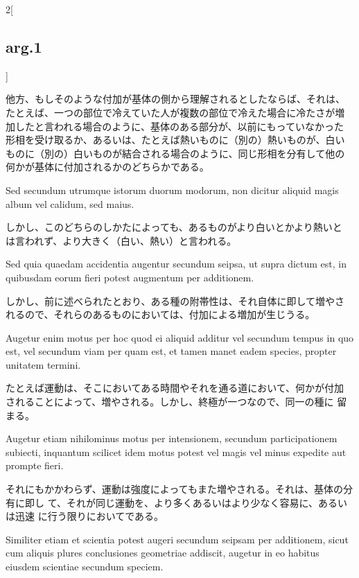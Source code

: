 \documentclass[paper=a4paper,fontsize=10pt,jafontsize=9pt,titlepage]{jlreq}
\begin{document}
\begin{paracol}{2}[\subsection{arg.1}]
\switchcolumn

他方、もしそのような付加が基体の側から理解されるとしたならば、それは、
たとえば、一つの部位で冷えていた人が複数の部位で冷えた場合に冷たさが増
加したと言われる場合のように、基体のある部分が、以前にもっていなかった
形相を受け取るか、あるいは、たとえば熱いものに（別の）熱いものが、白い
ものに（別の）白いものが結合される場合のように、同じ形相を分有して他の
何かが基体に付加されるかのどちらかである。

\switchcolumn*

Sed secundum utrumque istorum
duorum modorum, non dicitur aliquid magis album vel calidum, sed
maius.

\switchcolumn

しかし、このどちらのしかたによっても、あるものがより白いとかより熱いと
は言われず、より大きく（白い、熱い）と言われる。

\switchcolumn*

Sed quia quaedam accidentia augentur secundum seipsa, ut supra
dictum est, in quibusdam eorum fieri potest augmentum per
additionem.

\switchcolumn

しかし、前に述べられたとおり、ある種の附帯性は、それ自体に即して増やさ
 れるので、それらのあるものにおいては、付加による増加が生じうる。

\switchcolumn*

Augetur enim motus per hoc quod ei aliquid additur vel
secundum tempus in quo est, vel secundum viam per quam est, et tamen
manet eadem species, propter unitatem termini.

\switchcolumn

たとえば運動は、そこにおいてある時間やそれを通る道において、何かが付加
されることによって、増やされる。しかし、終極が一つなので、同一の種に
留まる。

\switchcolumn*

Augetur etiam
nihilominus motus per intensionem, secundum participationem subiecti,
inquantum scilicet idem motus potest vel magis vel minus expedite aut
prompte fieri.

\switchcolumn

それにもかかわらず、運動は強度によってもまた増やされる。それは、基体の分有に即し
 て、それが同じ運動を、より多くあるいはより少なく容易に、あるいは迅速
 に行う限りにおいてである。

\switchcolumn*

Similiter etiam et scientia potest augeri secundum
seipsam per additionem, sicut cum aliquis plures conclusiones
geometriae addiscit, augetur in eo habitus eiusdem scientiae secundum
speciem.


\end{paracol}
\end{document}

